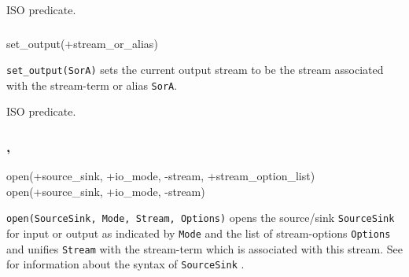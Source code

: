 \Portability

ISO predicate.

\subsubsection{\label{set-output/1}}

\begin{TemplatesOneCol}
set\_output(+stream\_or\_alias)

\end{TemplatesOneCol}

\Description

\texttt{set\_output(SorA)} sets the current output stream to be the stream
associated with the stream-term or alias \texttt{SorA}.

\begin{PlErrors}





\end{PlErrors}

\Portability

ISO predicate.

\subsubsection{,\label{open/4}
               }


\begin{TemplatesOneCol}
open(+source\_sink, +io\_mode, -stream, +stream\_option\_list)\\
open(+source\_sink, +io\_mode, -stream)

\end{TemplatesOneCol}

\Description

\texttt{open(SourceSink, Mode, Stream, Options)} opens the source/sink
\texttt{SourceSink} for input or output as indicated by \texttt{Mode} and
the list of stream-options \texttt{Options} and unifies \texttt{Stream} with
the stream-term which is associated with this stream. See
 for information about the syntax of
\texttt{SourceSink} .

